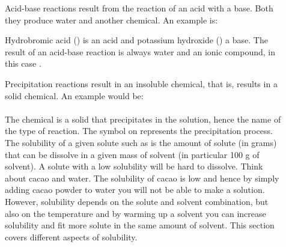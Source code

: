 \documentclass[main.tex]{subfiles} %
\begin{document}
\begin{description}
\item[] Acid-base reactions result from the reaction of an acid with a base. Both they produce water and another chemical. An example is:
\begin{center}\end{center}
Hydrobromic acid () is an acid and potassium hydroxide () a base.
The result of an acid-base reaction is always water and an ionic compound, in this case .

\item[] Precipitation reactions result in an insoluble chemical, that is, results in a solid chemical. An example would be:\\
\\

The chemical  is a solid that precipitates in the solution, hence the name of the type of reaction. The symbol on  represents the precipitation process. The solubility of a given solute such as  is the amount of solute (in grams) that can be dissolve in a given mass of solvent (in particular 100 g of solvent). A solute with a low solubility will be hard to dissolve. Think about cacao and water. The solubility of cacao is low and hence by simply adding cacao powder to water you will not be able to make a solution. However, solubility depends on the solute and solvent combination, but also on the temperature and by warming up a solvent you can increase solubility and fit more solute in the same amount of solvent. This section covers different aspects of solubility.


\end{description}
\end{document}
